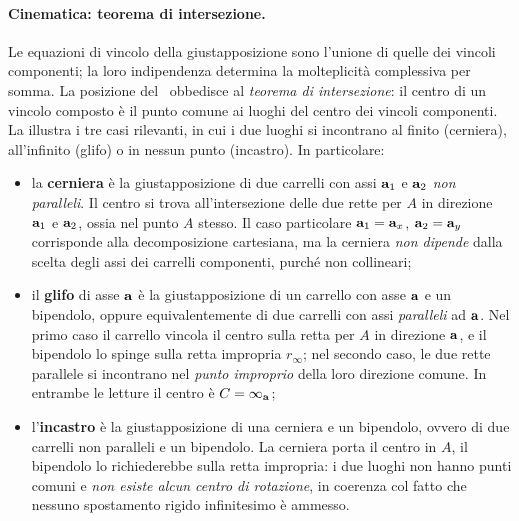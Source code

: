 \paragraph{Cinematica: teorema di intersezione.}
Le equazioni di vincolo della giustapposizione sono l'unione 
di quelle dei vincoli componenti; la loro indipendenza 
determina la molteplicità complessiva per somma. La 
posizione del \CRa\ obbedisce al \emph{teorema di 
	intersezione}: il centro di un vincolo composto è il punto 
comune ai luoghi del centro dei vincoli componenti. La 
 illustra i tre casi 
rilevanti, in cui i due luoghi si incontrano al finito 
(cerniera), all'infinito (glifo) o in nessun punto 
(incastro). In particolare:
\begin{itemize}[noitemsep]
	\item la \textbf{cerniera} è la giustapposizione di due
	carrelli con assi $\mathbf{a}_1$ e $\mathbf{a}_2$ \emph{non paralleli}.
	Il centro si trova all'intersezione delle due rette per
	$A$ in direzione $\mathbf{a}_1$ e $\mathbf{a}_2$, ossia nel punto $A$
	stesso. Il caso particolare $\mathbf{a}_1 = \mathbf{a}_x$,
	$\mathbf{a}_2 = \mathbf{a}_y$ corrisponde alla decomposizione
	cartesiana, ma la cerniera \emph{non dipende} dalla
	scelta degli assi dei carrelli componenti, purché non
	collineari;
	
	\item il \textbf{glifo} di asse $\mathbf{a}$ è la giustapposizione
	di un carrello con asse $\mathbf{a}$ e un bipendolo, oppure 
	equivalentemente di due carrelli con assi \emph{paralleli}
	ad $\mathbf{a}$. Nel primo caso il carrello vincola il centro
	sulla retta per $A$ in direzione $\mathbf{a}$, e il bipendolo lo
	spinge sulla retta impropria $r_\infty$; nel secondo caso,
	le due rette parallele si incontrano nel \emph{punto
		improprio} della loro direzione comune. In entrambe le 
	letture il centro è $C = \infty_{\mathbf{a}}$;
	
	\item l'\textbf{incastro} è la giustapposizione di una
	cerniera e un bipendolo, ovvero di due carrelli non
	paralleli e un bipendolo. La cerniera porta il centro in
	$A$, il bipendolo lo richiederebbe sulla retta impropria:
	i due luoghi non hanno punti comuni e \emph{non esiste 
		alcun centro di rotazione}, in coerenza col fatto che 
	nessuno spostamento rigido infinitesimo è ammesso.
\end{itemize}




